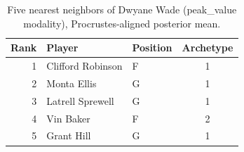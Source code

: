 \begin{table}[htbp]
  \centering\small
  \begin{tabular}{rllc}
    \toprule
    Rank & Player & Position & Archetype \\
    \midrule
    1 & Clifford Robinson & F & 1 \\
    2 & Monta Ellis & G & 1 \\
    3 & Latrell Sprewell & G & 1 \\
    4 & Vin Baker & F & 2 \\
    5 & Grant Hill & G & 1 \\
    \bottomrule
  \end{tabular}
  \caption{Five nearest neighbors of Dwyane Wade (peak_value modality), Procrustes-aligned posterior mean.}
  \label{tab:Dwyane_Wade_neighbors_peak_value}
\end{table}

